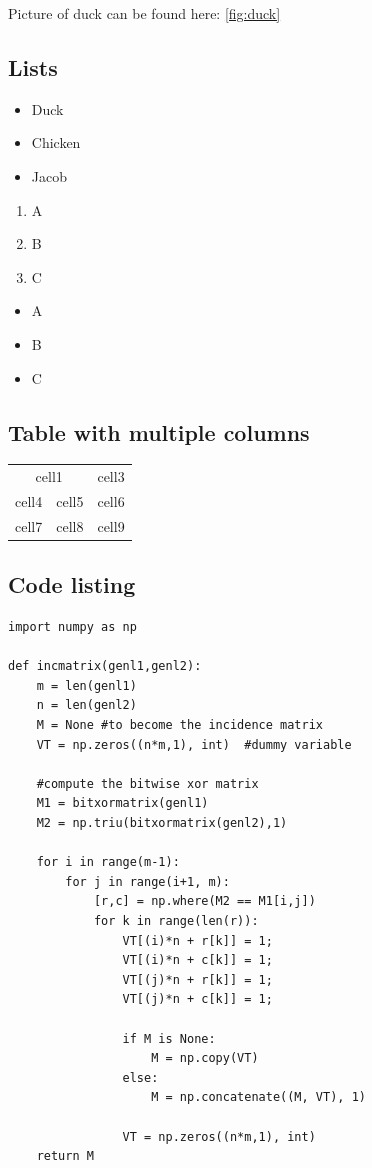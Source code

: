 \documentclass[a4paper]{article}
\begin{document}
Picture of duck can be found here: \ref{fig:duck}


\subsection{Lists}
\begin{itemize}
  \item Duck
  \item Chicken
  \item Jacob
\end{itemize}

\begin{enumerate}
  \item A
  \item B
  \item C
\end{enumerate}


\renewcommand{\labelitemi}{\Checkmark}
\begin{itemize}
  \item A
  \item B
  \item C
\end{itemize}

\subsection{Table with multiple columns}
\begin{center}
\begin{tabular}{ |c|c|c| } 
 \hline
 \multicolumn{2}{c}{cell1} & cell3 \\ 
 cell4 & cell5 & cell6 \\ 
 cell7 & cell8 & cell9 \\ 
 \hline
\end{tabular}
\end{center}

\subsection{Code listing}
\begin{lstlisting}
import numpy as np
    
def incmatrix(genl1,genl2):
    m = len(genl1)
    n = len(genl2)
    M = None #to become the incidence matrix
    VT = np.zeros((n*m,1), int)  #dummy variable
    
    #compute the bitwise xor matrix
    M1 = bitxormatrix(genl1)
    M2 = np.triu(bitxormatrix(genl2),1) 

    for i in range(m-1):
        for j in range(i+1, m):
            [r,c] = np.where(M2 == M1[i,j])
            for k in range(len(r)):
                VT[(i)*n + r[k]] = 1;
                VT[(i)*n + c[k]] = 1;
                VT[(j)*n + r[k]] = 1;
                VT[(j)*n + c[k]] = 1;
                
                if M is None:
                    M = np.copy(VT)
                else:
                    M = np.concatenate((M, VT), 1)
            
                VT = np.zeros((n*m,1), int)
    return M
\end{lstlisting}
\end{document}
